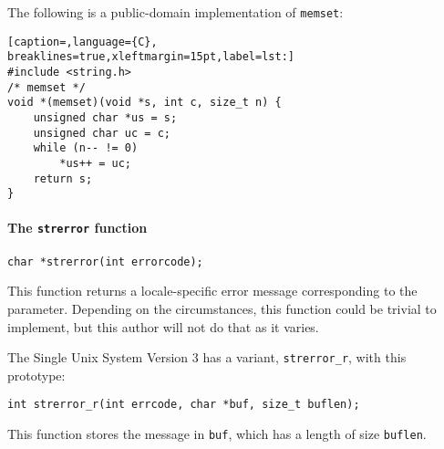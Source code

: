 The following is a public-domain implementation of \texttt{memset}:
\lstset{basicstyle=\scriptsize, numbers=left, captionpos=b, tabsize=4}
\begin{lstlisting}[caption=,language={C},
breaklines=true,xleftmargin=15pt,label=lst:]
#include <string.h>
/* memset */
void *(memset)(void *s, int c, size_t n) {
	unsigned char *us = s;
	unsigned char uc = c;
	while (n-- != 0)
		*us++ = uc;
	return s;
}
\end{lstlisting}

\paragraph{The \texttt{strerror} function}
\texttt{char *strerror(int errorcode);}

This function returns a locale-specific error message corresponding to the
parameter. Depending on the circumstances, this function could be trivial to
implement, but this author will not do that as it varies.

The Single Unix System Version 3 has a variant, \texttt{strerror\_r}, with this
prototype:

\texttt{int strerror\_r(int errcode, char *buf, size\_t buflen);}

This function stores the message in \texttt{buf}, which has a length of size
\texttt{buflen}.
